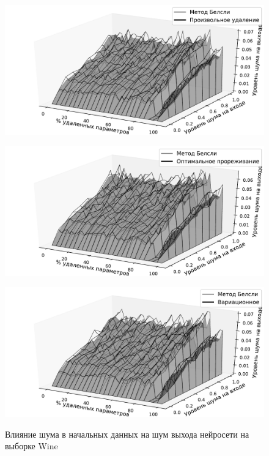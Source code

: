 \begin{figure}[h!t]\center
\begin{minipage}[t]{0.45\textwidth}
{\includegraphics[width=\textwidth]{plots/grabovoy/Wine/RandomNoise3D.pdf}}
\end{minipage}
\begin{minipage}[t]{0.45\textwidth}
{\includegraphics[width=\textwidth]{plots/grabovoy/Wine/OBDNoise3D.pdf}}
\end{minipage}
\begin{minipage}[t]{0.45\textwidth}
{\includegraphics[width=\textwidth]{plots/grabovoy/Wine/VariationalNoise3D.pdf}}
\end{minipage}

\label{WineNoise}
\caption{Влияние шума в начальных данных на шум выхода нейросети на выборке Wine}
\end{figure}

